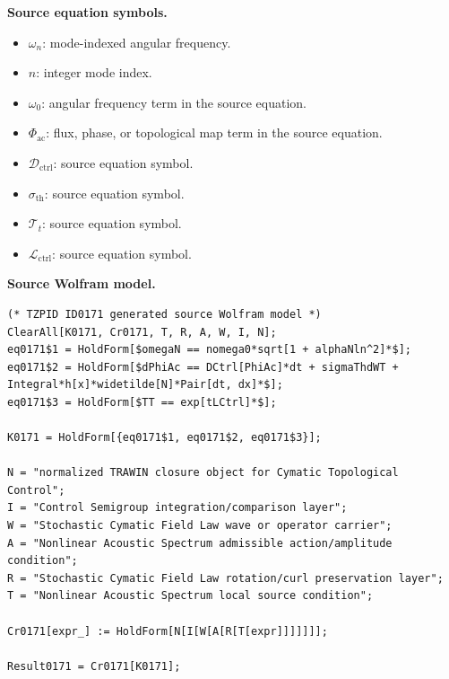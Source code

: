 \begin{minipage}[t]{0.49\linewidth}
\begingroup
\small
\raggedright
\textbf{Source equation symbols.}\par
\begin{itemize}[leftmargin=1.35em,itemsep=1pt,topsep=1pt,parsep=0pt]
    \item $\omega_n$: mode-indexed angular frequency.
    \item $n$: integer mode index.
    \item $\omega_0$: angular frequency term in the source equation.
    \item $\Phi_{\mathrm{ac}}$: flux, phase, or topological map term in the source equation.
    \item $\mathcal{D}_{\mathrm{ctrl}}$: source equation symbol.
    \item $\sigma_{\mathrm{th}}$: source equation symbol.
    \item $\mathcal{T}_t$: source equation symbol.
    \item $\mathcal{L}_{\mathrm{ctrl}}$: source equation symbol.
\end{itemize}
\endgroup
\end{minipage}\hfill
\begin{minipage}[t]{0.47\linewidth}
\begingroup
\scriptsize
\raggedright
\textbf{Source Wolfram model.}\par
\begin{Verbatim}[fontsize=\tiny,breaklines=true,breakanywhere=true]
(* TZPID ID0171 generated source Wolfram model *)
ClearAll[K0171, Cr0171, T, R, A, W, I, N];
eq0171$1 = HoldForm[$omegaN == nomega0*sqrt[1 + alphaNln^2]*$];
eq0171$2 = HoldForm[$dPhiAc == DCtrl[PhiAc]*dt + sigmaThdWT + Integral*h[x]*widetilde[N]*Pair[dt, dx]*$];
eq0171$3 = HoldForm[$TT == exp[tLCtrl]*$];

K0171 = HoldForm[{eq0171$1, eq0171$2, eq0171$3}];

N = "normalized TRAWIN closure object for Cymatic Topological Control";
I = "Control Semigroup integration/comparison layer";
W = "Stochastic Cymatic Field Law wave or operator carrier";
A = "Nonlinear Acoustic Spectrum admissible action/amplitude condition";
R = "Stochastic Cymatic Field Law rotation/curl preservation layer";
T = "Nonlinear Acoustic Spectrum local source condition";

Cr0171[expr_] := HoldForm[N[I[W[A[R[T[expr]]]]]]];

Result0171 = Cr0171[K0171];
\end{Verbatim}
\endgroup
\end{minipage}

